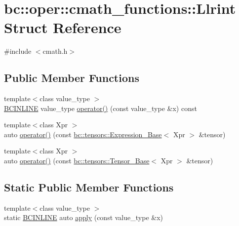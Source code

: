 \hypertarget{structbc_1_1oper_1_1cmath__functions_1_1Llrint}{}\section{bc\+:\+:oper\+:\+:cmath\+\_\+functions\+:\+:Llrint Struct Reference}
\label{structbc_1_1oper_1_1cmath__functions_1_1Llrint}


{\ttfamily \#include $<$cmath.\+h$>$}

\subsection*{Public Member Functions}
\begin{DoxyCompactItemize}
\item 
{\footnotesize template$<$class value\+\_\+type $>$ }\\\hyperlink{common_8h_a6699e8b0449da5c0fafb878e59c1d4b1}{B\+C\+I\+N\+L\+I\+NE} value\+\_\+type \hyperlink{structbc_1_1oper_1_1cmath__functions_1_1Llrint_a93cbea72af8261ad2fa49fc11563e82e}{operator()} (const value\+\_\+type \&x) const
\item 
{\footnotesize template$<$class Xpr $>$ }\\auto \hyperlink{structbc_1_1oper_1_1cmath__functions_1_1Llrint_a3af811bd92a65905435e2b5e3fe08d4e}{operator()} (const \hyperlink{classbc_1_1tensors_1_1Expression__Base}{bc\+::tensors\+::\+Expression\+\_\+\+Base}$<$ Xpr $>$ \&tensor)
\item 
{\footnotesize template$<$class Xpr $>$ }\\auto \hyperlink{structbc_1_1oper_1_1cmath__functions_1_1Llrint_afa9b799d3365fbb74fd418b0f1fac805}{operator()} (const \hyperlink{classbc_1_1tensors_1_1Tensor__Base}{bc\+::tensors\+::\+Tensor\+\_\+\+Base}$<$ Xpr $>$ \&tensor)
\end{DoxyCompactItemize}
\subsection*{Static Public Member Functions}
\begin{DoxyCompactItemize}
\item 
{\footnotesize template$<$class value\+\_\+type $>$ }\\static \hyperlink{common_8h_a6699e8b0449da5c0fafb878e59c1d4b1}{B\+C\+I\+N\+L\+I\+NE} auto \hyperlink{structbc_1_1oper_1_1cmath__functions_1_1Llrint_ac81877dcfa9bf717c464597ebacc92ad}{apply} (const value\+\_\+type \&x)
\end{DoxyCompactItemize}



